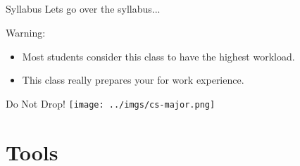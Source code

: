 \documentclass{beamer}
\begin{document}
\subsection{}

\begin{frame}{Syllabus}
Lets go over the syllabus...
\end{frame}

\begin{frame}{Warning:}
\begin{itemize}
\item Most students consider this class to have the highest workload.
\item This class really prepares your for work experience.
\end{itemize}
\end{frame}

\begin{frame}{Do Not Drop!}
\texttt{[image: ../imgs/cs-major.png]}
\end{frame}


\section{Tools}
\end{document}
